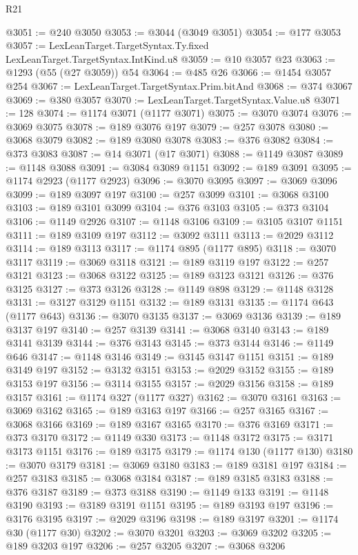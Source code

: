 \begin{lexlean}{R21}
\begin{coremodule}
@3051 := @240 @3050
@3053 := @3044 (@3049 @3051)
@3054 := @177 @3053
@3057 := LexLeanTarget.TargetSyntax.Ty.fixed LexLeanTarget.TargetSyntax.IntKind.u8
@3059 := @10 @3057 @23
@3063 := @1293 (@55 (@27 @3059)) @54
@3064 := @485 @26
@3066 := @1454 @3057 @254
@3067 := LexLeanTarget.TargetSyntax.Prim.bitAnd
@3068 := @374 @3067
@3069 := @380 @3057
@3070 := LexLeanTarget.TargetSyntax.Value.u8
@3071 := 128
@3074 := @1174 @3071 (@1177 @3071)
@3075 := @3070 @3074
@3076 := @3069 @3075
@3078 := @189 @3076 @197
@3079 := @257 @3078
@3080 := @3068 @3079
@3082 := @189 @3080 @3078
@3083 := @376 @3082
@3084 := @373 @3083
@3087 := @14 @3071 (@17 @3071)
@3088 := @1149 @3087
@3089 := @1148 @3088
@3091 := @3084 @3089 @1151
@3092 := @189 @3091
@3095 := @1174 @2923 (@1177 @2923)
@3096 := @3070 @3095
@3097 := @3069 @3096
@3099 := @189 @3097 @197
@3100 := @257 @3099
@3101 := @3068 @3100
@3103 := @189 @3101 @3099
@3104 := @376 @3103
@3105 := @373 @3104
@3106 := @1149 @2926
@3107 := @1148 @3106
@3109 := @3105 @3107 @1151
@3111 := @189 @3109 @197
@3112 := @3092 @3111
@3113 := @2029 @3112
@3114 := @189 @3113
@3117 := @1174 @895 (@1177 @895)
@3118 := @3070 @3117
@3119 := @3069 @3118
@3121 := @189 @3119 @197
@3122 := @257 @3121
@3123 := @3068 @3122
@3125 := @189 @3123 @3121
@3126 := @376 @3125
@3127 := @373 @3126
@3128 := @1149 @898
@3129 := @1148 @3128
@3131 := @3127 @3129 @1151
@3132 := @189 @3131
@3135 := @1174 @643 (@1177 @643)
@3136 := @3070 @3135
@3137 := @3069 @3136
@3139 := @189 @3137 @197
@3140 := @257 @3139
@3141 := @3068 @3140
@3143 := @189 @3141 @3139
@3144 := @376 @3143
@3145 := @373 @3144
@3146 := @1149 @646
@3147 := @1148 @3146
@3149 := @3145 @3147 @1151
@3151 := @189 @3149 @197
@3152 := @3132 @3151
@3153 := @2029 @3152
@3155 := @189 @3153 @197
@3156 := @3114 @3155
@3157 := @2029 @3156
@3158 := @189 @3157
@3161 := @1174 @327 (@1177 @327)
@3162 := @3070 @3161
@3163 := @3069 @3162
@3165 := @189 @3163 @197
@3166 := @257 @3165
@3167 := @3068 @3166
@3169 := @189 @3167 @3165
@3170 := @376 @3169
@3171 := @373 @3170
@3172 := @1149 @330
@3173 := @1148 @3172
@3175 := @3171 @3173 @1151
@3176 := @189 @3175
@3179 := @1174 @130 (@1177 @130)
@3180 := @3070 @3179
@3181 := @3069 @3180
@3183 := @189 @3181 @197
@3184 := @257 @3183
@3185 := @3068 @3184
@3187 := @189 @3185 @3183
@3188 := @376 @3187
@3189 := @373 @3188
@3190 := @1149 @133
@3191 := @1148 @3190
@3193 := @3189 @3191 @1151
@3195 := @189 @3193 @197
@3196 := @3176 @3195
@3197 := @2029 @3196
@3198 := @189 @3197
@3201 := @1174 @30 (@1177 @30)
@3202 := @3070 @3201
@3203 := @3069 @3202
@3205 := @189 @3203 @197
@3206 := @257 @3205
@3207 := @3068 @3206

\end{coremodule}
\end{lexlean}
